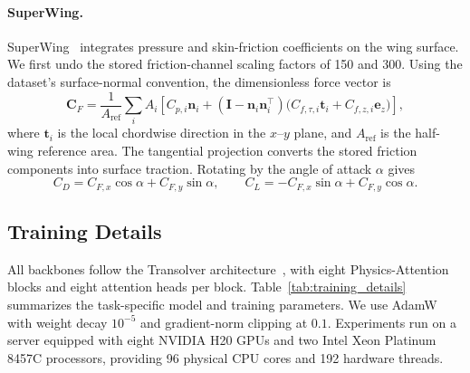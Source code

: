 \documentclass{article}
\begin{document}
\paragraph{SuperWing.}
SuperWing~\citep{yang2025superwing} integrates pressure and skin-friction coefficients on the wing surface. We first undo the stored friction-channel scaling factors of 150 and 300. Using the dataset's surface-normal convention, the dimensionless force vector is
\begin{equation}
    \mathbf{C}_F
    =\frac{1}{A_{\mathrm{ref}}}\sum_i A_i
    \left[
        C_{p,i}\mathbf{n}_i
        +(\mathbf{I}-\mathbf{n}_i\mathbf{n}_i^{\top})
        \bigl(C_{f,\tau,i}\mathbf{t}_i+C_{f,z,i}\mathbf{e}_z\bigr)
    \right],
    \label{eq:app_superwing_force}
\end{equation}
where $\mathbf{t}_i$ is the local chordwise direction in the $x$--$y$ plane, and $A_{\mathrm{ref}}$ is the half-wing reference area. The tangential projection converts the stored friction components into surface traction. Rotating by the angle of attack $\alpha$ gives
\begin{equation}
    C_D=C_{F,x}\cos\alpha+C_{F,y}\sin\alpha,
    \qquad
    C_L=-C_{F,x}\sin\alpha+C_{F,y}\cos\alpha.
    \label{eq:app_superwing_coefficients}
\end{equation}

\clearpage
\subsection{Training Details}
\label{app:training_details}

All backbones follow the Transolver architecture~\citep{wu2024transolver}, with eight Physics-Attention blocks and eight attention heads per block. Table~\ref{tab:training_details} summarizes the task-specific model and training parameters. We use AdamW with weight decay $10^{-5}$ and gradient-norm clipping at $0.1$. Experiments run on a server equipped with eight NVIDIA H20 GPUs and two Intel Xeon Platinum 8457C processors, providing 96 physical CPU cores and 192 hardware threads.
\end{document}
